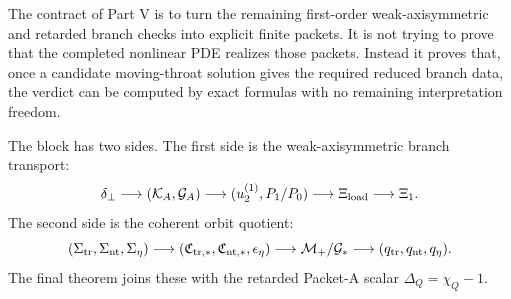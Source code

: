 The contract of Part V is to turn the remaining first-order weak-axisymmetric and retarded branch checks into explicit finite packets.  It is not trying to prove that the completed nonlinear PDE realizes those packets.  Instead it proves that, once a candidate moving-throat solution gives the required reduced branch data, the verdict can be computed by exact formulas with no remaining interpretation freedom.

The block has two sides.  The first side is the weak-axisymmetric branch transport:
\begin{equation}
\label{eq:app-part05-chain-branch-side}
\delta_\perp
\longrightarrow
(\mathcal K_A,\mathcal G_A)
\longrightarrow
(u_2^{(1)},P_1/P_0)
\longrightarrow
\Xi_{\rm load}
\longrightarrow
\Xi_1.
\end{equation}
The second side is the coherent orbit quotient:
\begin{equation}
\label{eq:app-part05-chain-orbit-side}
(\Sigma_{\rm tr},\Sigma_{\rm nt},\Sigma_\eta)
\longrightarrow
(\mathfrak C_{{\rm tr},*},\mathfrak C_{{\rm nt},*},\epsilon_\eta)
\longrightarrow
\mathcal M_+/\mathcal G_*
\longrightarrow
(q_{\rm tr},q_{\rm nt},q_\eta).
\end{equation}
The final theorem joins these with the retarded Packet-A scalar \(\Delta_Q=\chi_Q-1\).

